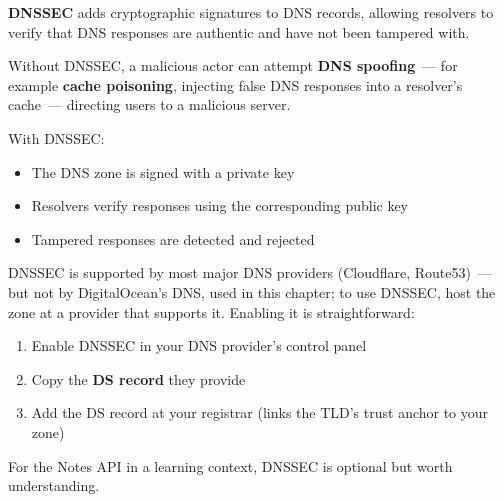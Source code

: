 \textbf{DNSSEC} adds cryptographic signatures to DNS records, allowing resolvers to verify that DNS responses are authentic and have not been tampered with.

Without DNSSEC, a malicious actor can attempt \textbf{DNS spoofing}~--- for example \textbf{cache poisoning}, injecting false DNS responses into a resolver's cache~--- directing users to a malicious server.

With DNSSEC:

\begin{itemize}
\tightlist
\item
  The DNS zone is signed with a private key
\item
  Resolvers verify responses using the corresponding public key
\item
  Tampered responses are detected and rejected
\end{itemize}

\noindent{}DNSSEC is supported by most major DNS providers (Cloudflare, Route53)~--- but not by DigitalOcean's DNS, used in this chapter; to use DNSSEC, host the zone at a provider that supports it. Enabling it is straightforward:

\begin{enumerate}
\def\labelenumi{\arabic{enumi}.}
\tightlist
\item
  Enable DNSSEC in your DNS provider's control panel
\item
  Copy the \textbf{DS record} they provide
\item
  Add the DS record at your registrar (links the TLD's trust anchor to your zone)
\end{enumerate}

\noindent{}For the Notes API in a learning context, DNSSEC is optional but worth understanding.

